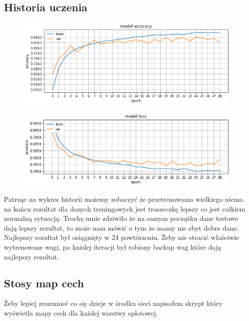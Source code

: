 \documentclass{article}
\begin{document}
\subsection{Historia uczenia}
\begin{figure}[H]
	\centering
	\includegraphics[width=1\textwidth,keepaspectratio=true]{accuracy}
	\caption{}
	\label{accuracy}
\end{figure}

\begin{figure}[H]
	\centering
	\includegraphics[width=1\textwidth,keepaspectratio=true]{loss}
	\caption{}
	\label{loss}
\end{figure}

Patrząc na wykres historii możemy zobaczyć że przetrenowania wielkiego niema. na końcu rezultat dla danych treningowych jest troszeczkę lepszy co jest całkiem normalną sytuacją. Trochę mnie zdziwiło że na samym początku dane testowe dają lepszy rezultat, to może nam mówić o tym że mamy nie zbyt dobre dane. Najlepszy rezultat był osiągnięty w 24 powtórzeniu. Żeby nie stracić właściwie wytrenowane wagi, po każdej iteracji był robiony backup wag które dają najlepszy rezultat. 
\subsection{Stosy map cech}

Żeby lepiej zrozumieć co się dzieje w środku sieci napisałem skrypt który wyświetla mapy cech dla każdej warstwy splotowej.
\end{document}
